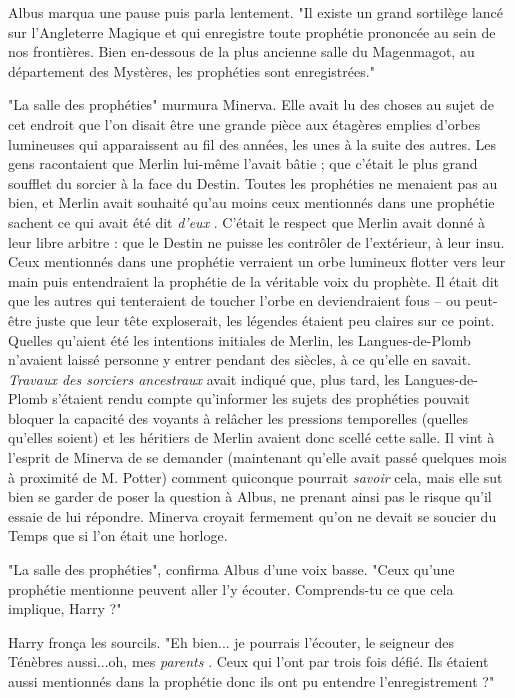Albus marqua une pause puis parla lentement. "Il existe un grand sortilège lancé sur l'Angleterre Magique et qui enregistre toute prophétie prononcée au sein de nos frontières. Bien en-dessous de la plus ancienne salle du Magenmagot, au département des Mystères, les prophéties sont enregistrées."

"La salle des prophéties" murmura Minerva. Elle avait lu des choses au sujet de cet endroit que l'on disait être une grande pièce aux étagères emplies d'orbes lumineuses qui apparaissent au fil des années, les unes à la suite des autres. Les gens racontaient que Merlin lui-même l'avait bâtie ; que c'était le plus grand soufflet du sorcier à la face du Destin. Toutes les prophéties ne menaient pas au bien, et Merlin avait souhaité qu'au moins ceux mentionnés dans une prophétie sachent ce qui avait été dit \emph{d'eux} . C'était le respect que Merlin avait donné à leur libre arbitre : que le Destin ne puisse les contrôler de l'extérieur, à leur insu. Ceux mentionnés dans une prophétie verraient un orbe lumineux flotter vers leur main puis entendraient la prophétie de la véritable voix du prophète. Il était dit que les autres qui tenteraient de toucher l'orbe en deviendraient fous – ou peut-être juste que leur tête exploserait, les légendes étaient peu claires sur ce point. Quelles qu'aient été les intentions initiales de Merlin, les Langues-de-Plomb n'avaient laissé personne y entrer pendant des siècles, à ce qu'elle en savait. \emph{Travaux des sorciers ancestraux } avait indiqué que, plus tard, les Langues-de-Plomb s'étaient rendu compte qu'informer les sujets des prophéties pouvait bloquer la capacité des voyants à relâcher les pressions temporelles (quelles qu'elles soient) et les héritiers de Merlin avaient donc scellé cette salle. Il vint à l'esprit de Minerva de se demander (maintenant qu'elle avait passé quelques mois à proximité de M. Potter) comment quiconque pourrait \emph{savoir}  cela, mais elle sut bien se garder de poser la question à Albus, ne prenant ainsi pas le risque qu'il essaie de lui répondre. Minerva croyait fermement qu'on ne devait se soucier du Temps que si l'on était une horloge.

"La salle des prophéties", confirma Albus d'une voix basse. "Ceux qu'une prophétie mentionne peuvent aller l'y écouter. Comprends-tu ce que cela implique, Harry ?"

Harry fronça les sourcils. "Eh bien... je pourrais l'écouter, le seigneur des Ténèbres aussi...oh, mes \emph{parents} . Ceux qui l'ont par trois fois défié. Ils étaient aussi mentionnés dans la prophétie donc ils ont pu entendre l'enregistrement ?"

